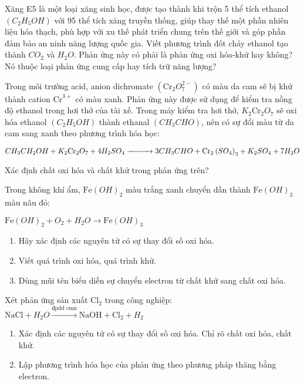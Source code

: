 \begin{bt}
	Xăng E5 là một loại xăng sinh học, được tạo thành khi trộn 5 thể tích ethanol $\left(C_2H_5OH\right)$ với 95 thể tích xăng truyền thống, giúp thay thế một phần nhiên liệu hóa thạch, phù hợp với xu thế phát triển chung trên thế giới và góp phần đảm bảo an ninh năng lượng quốc gia. Viết phương trình đốt cháy ethanol tạo thành $CO_2$ và $H_2O$. Phản ứng này có phải là phản ứng oxi hóa-khử hay không? Nó thuộc loại phản ứng cung cấp hay tích trữ năng lượng?
	\loigiai{}
\end{bt}
\begin{bt}
	Trong môi trường acid, anion dichromate $\left(\mathrm{Cr}_2O_7^{2-}\right)$ có màu da cam sẽ bị khử thành cation $\mathrm{Cr}^{3+}$ có màu xanh. Phản ứng này được sử dụng để kiểm tra nồng độ ethanol trong hơi thở của tài xế. Trong máy kiểm tra hơi thở, $K_2\mathrm{Cr}_2O_7$ sẽ oxi hóa ethanol $\left(C_2H_5OH\right)$ thành ethanal $\left(CH_3CHO\right)$, nên có sự đổi màu từ da cam sang xanh theo phương trình hóa học:
	\begin{center}
		$CH_3 CH_2 OH+K_2\mathrm{Cr}_2O_7+4 H_2 SO_4 \xrightarrow[]{\makebox[1cm]{}} 3 CH_3 CHO+\mathrm{Cr}_2\left(SO_4\right)_3+K_2 SO_4+7 H_2 O$
	\end{center}
	Xác định chất oxi hóa và chất khử trong phản ứng trên?
	\loigiai{}
\end{bt}
\begin{bt}
	Trong không khí ẩm, $\mathrm{Fe}(OH)_2$ màu trắng xanh chuyển dần thành $\mathrm{Fe}(OH)_3$ màu nâu đỏ:
	\begin{center}
		$\mathrm{Fe}(OH)_2+O_2+H_2 O \to \mathrm{Fe}(OH)_3$
	\end{center}
	\begin{enumerate}
		\item Hãy xác định các nguyên tử có sự thay đổi số oxi hóa.
		\item Viết quá trình oxi hóa, quá trình khử.
		\item Dùng mũi tên biểu diễn sự chuyển electron từ chất khử sang chất oxi hóa.
	\end{enumerate}
	\loigiai{}
\end{bt}
\begin{bt}
	Xét phản ứng sản xuất $\mathrm{Cl}_2$ trong công nghiệp: $\mathrm{NaCl}+H_2O\xrightarrow{\text {đpdd cmn}} \mathrm{NaOH}+\mathrm{Cl}_2+H_2$
	\begin{enumerate}
		\item Xác định các nguyên tử có sự thay đổi số oxi hóa. Chỉ rõ chất oxi hóa, chất khử.
		\item Lập phương trình hóa học của phản ứng theo phương pháp thăng bằng electron.
	\end{enumerate}
	\loigiai{}
\end{bt}
